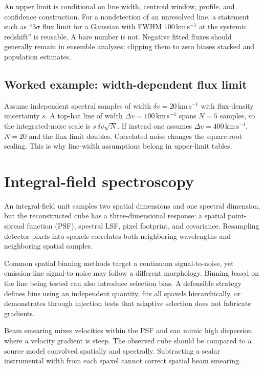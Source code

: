 An upper limit is conditional on line width, centroid window, profile, and confidence
construction.  For a nondetection of an unresolved line, a statement such as
``$3\sigma$ flux limit for a Gaussian with FWHM
$100\,\mathrm{km\,s^{-1}}$ at the systemic redshift'' is reusable.  A bare number is
not.  Negative fitted fluxes should generally remain in ensemble analyses; clipping
them to zero biases stacked and population estimates.

\subsection{Worked example: width-dependent flux limit}

Assume independent spectral samples of width $\delta v=20\,\mathrm{km\,s^{-1}}$
with flux-density uncertainty $s$.  A top-hat line of width
$\Delta v=100\,\mathrm{km\,s^{-1}}$ spans $N=5$ samples, so the integrated-noise
scale is $s\,\delta v\sqrt{N}$.  If instead one assumes
$\Delta v=400\,\mathrm{km\,s^{-1}}$, $N=20$ and the flux limit doubles.  Correlated
noise changes the square-root scaling.  This is why line-width assumptions belong in
upper-limit tables.

\section{Integral-field spectroscopy}

An integral-field unit samples two spatial dimensions and one spectral dimension, but
the reconstructed cube has a three-dimensional response: a spatial point-spread
function (PSF), spectral LSF, pixel footprint, and covariance.  Resampling detector
pixels into spaxels correlates both neighboring wavelengths and neighboring spatial
samples.

Common spatial binning methods target a continuum signal-to-noise, yet emission-line
signal-to-noise may follow a different morphology.  Binning based on the line being
tested can also introduce selection bias.  A defensible strategy defines bins using
an independent quantity, fits all spaxels hierarchically, or demonstrates through
injection tests that adaptive selection does not fabricate gradients.

Beam smearing mixes velocities within the PSF and can mimic high dispersion where a
velocity gradient is steep.  The observed cube should be compared to a source model
convolved spatially and spectrally.  Subtracting a scalar instrumental width from each
spaxel cannot correct spatial beam smearing.

